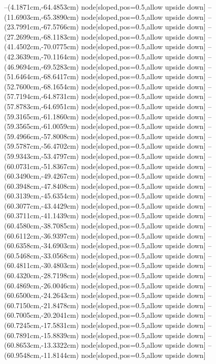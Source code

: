 --(4.1871cm,-64.4853cm) node[sloped,pos=0.5,allow upside down]{\ArrowIn}
--(11.6903cm,-65.3890cm) node[sloped,pos=0.5,allow upside down]{\ArrowIn}
--(23.7991cm,-67.5766cm) node[sloped,pos=0.5,allow upside down]{\ArrowIn}
--(27.2699cm,-68.1183cm) node[sloped,pos=0.5,allow upside down]{\ArrowIn}
--(41.4502cm,-70.0775cm) node[sloped,pos=0.5,allow upside down]{\ArrowIn}
--(42.3639cm,-70.1164cm) node[sloped,pos=0.5,allow upside down]{\arrowIn}
--(46.9694cm,-69.5283cm) node[sloped,pos=0.5,allow upside down]{\ArrowIn}
--(51.6464cm,-68.6417cm) node[sloped,pos=0.5,allow upside down]{\ArrowIn}
--(52.7600cm,-68.1654cm) node[sloped,pos=0.5,allow upside down]{\ArrowIn}
--(57.7194cm,-64.8731cm) node[sloped,pos=0.5,allow upside down]{\ArrowIn}
--(57.8783cm,-64.6951cm) node[sloped,pos=0.5,allow upside down]{\arrowIn}
--(59.3165cm,-61.1860cm) node[sloped,pos=0.5,allow upside down]{\ArrowIn}
--(59.3565cm,-61.0059cm) node[sloped,pos=0.5,allow upside down]{\arrowIn}
--(59.4966cm,-57.8008cm) node[sloped,pos=0.5,allow upside down]{\ArrowIn}
--(59.5787cm,-56.4702cm) node[sloped,pos=0.5,allow upside down]{\ArrowIn}
--(59.9343cm,-53.4797cm) node[sloped,pos=0.5,allow upside down]{\ArrowIn}
--(60.0731cm,-51.8367cm) node[sloped,pos=0.5,allow upside down]{\ArrowIn}
--(60.3490cm,-49.4267cm) node[sloped,pos=0.5,allow upside down]{\ArrowIn}
--(60.3948cm,-47.8408cm) node[sloped,pos=0.5,allow upside down]{\ArrowIn}
--(60.3139cm,-45.6354cm) node[sloped,pos=0.5,allow upside down]{\ArrowIn}
--(60.3077cm,-43.4429cm) node[sloped,pos=0.5,allow upside down]{\ArrowIn}
--(60.3711cm,-41.1439cm) node[sloped,pos=0.5,allow upside down]{\ArrowIn}
--(60.4580cm,-38.7085cm) node[sloped,pos=0.5,allow upside down]{\ArrowIn}
--(60.6112cm,-36.9397cm) node[sloped,pos=0.5,allow upside down]{\ArrowIn}
--(60.6358cm,-34.6903cm) node[sloped,pos=0.5,allow upside down]{\ArrowIn}
--(60.5468cm,-33.0568cm) node[sloped,pos=0.5,allow upside down]{\ArrowIn}
--(60.4811cm,-30.4803cm) node[sloped,pos=0.5,allow upside down]{\ArrowIn}
--(60.4320cm,-28.7198cm) node[sloped,pos=0.5,allow upside down]{\ArrowIn}
--(60.4869cm,-26.0046cm) node[sloped,pos=0.5,allow upside down]{\ArrowIn}
--(60.6500cm,-24.2643cm) node[sloped,pos=0.5,allow upside down]{\ArrowIn}
--(60.7150cm,-21.8478cm) node[sloped,pos=0.5,allow upside down]{\ArrowIn}
--(60.7005cm,-20.2041cm) node[sloped,pos=0.5,allow upside down]{\ArrowIn}
--(60.7245cm,-17.5831cm) node[sloped,pos=0.5,allow upside down]{\ArrowIn}
--(60.7891cm,-15.8839cm) node[sloped,pos=0.5,allow upside down]{\ArrowIn}
--(60.8653cm,-13.3322cm) node[sloped,pos=0.5,allow upside down]{\ArrowIn}
--(60.9548cm,-11.8144cm) node[sloped,pos=0.5,allow upside down]{\ArrowIn}
